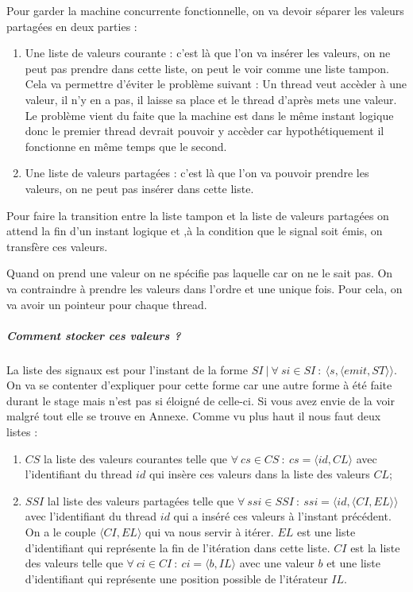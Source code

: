 \documentclass[10pt,a4paper]{report}
\begin{document}
Pour garder la machine concurrente fonctionnelle, on va devoir séparer les valeurs partagées en deux parties :
\begin{enumerate}
\item Une liste de valeurs courante : c'est là que l'on va insérer les valeurs, on ne peut pas prendre dans cette liste, on peut le voir comme une liste tampon. Cela va permettre d'éviter le problème suivant : 
  \smallbreak
  Un thread veut accèder à une valeur, il n'y en a pas, il laisse sa place et le thread d'après mets une valeur. Le problème vient du faite que la machine est dans le même instant logique donc le premier thread devrait pouvoir y accèder car hypothétiquement il fonctionne en même temps que le second.
\item Une liste de valeurs partagées : c'est là que l'on va pouvoir prendre les valeurs, on ne peut pas insérer dans cette liste.
\end{enumerate}
\smallbreak
Pour faire la transition entre la liste tampon et la liste de valeurs partagées on attend la fin d'un instant logique et ,à la condition que le signal soit émis, on transfère ces valeurs.
\medbreak

Quand on prend une valeur on ne spécifie pas laquelle car on ne le sait pas. On va contraindre à prendre les valeurs dans l'ordre et une unique fois. Pour cela, on va avoir un pointeur pour chaque thread. 

\subparagraph{Comment stocker ces valeurs ?} 
La liste des signaux est pour l'instant de la forme $SI~|~\forall~si \in SI~:~\langle s,\langle emit,ST \rangle\rangle$. On va se contenter d'expliquer pour cette forme car une autre forme à été faite durant le stage mais n'est pas si éloigné de celle-ci. Si vous avez envie de la voir malgré tout elle se trouve en Annexe. Comme vu plus haut il nous faut deux listes : 
\smallbreak
\begin{enumerate}
\item $CS$ la liste des valeurs courantes telle que $\forall~cs \in CS~:~cs = \langle id , CL \rangle$ avec l'identifiant du thread $id$ qui insère ces valeurs dans la liste des valeurs $CL$;
\item $SSI$ lal liste des valeurs partagées telle que $\forall~ssi \in SSI~:~ssi = \langle id,\langle CI,EL\rangle\rangle$ avec l'identifiant du thread $id$ qui a inséré ces valeurs à l'instant précédent. On a le couple $\langle CI,EL\rangle$ qui va nous servir à itérer. $EL$ est une liste d'identifiant qui représente la fin de l'itération dans cette liste. $CI$ est la liste des valeurs telle que $\forall~ci \in CI~:~ci = \langle b,IL\rangle$ avec une valeur $b$ et une liste d'identifiant qui représente une position possible de l'itérateur $IL$.
\end{enumerate}
\medbreak
\end{document}
